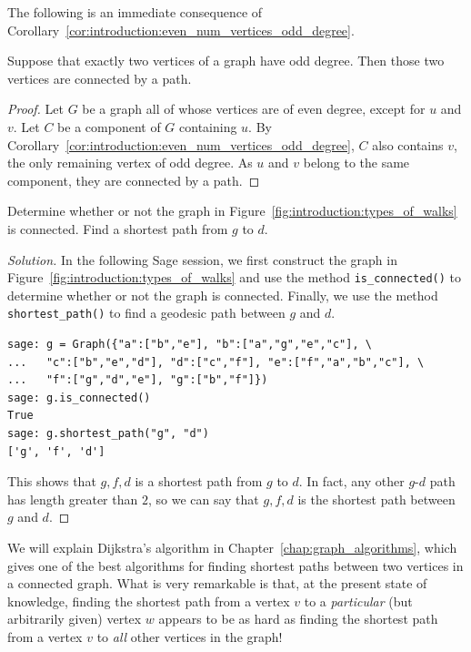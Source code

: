 The following is an immediate consequence of
Corollary~\ref{cor:introduction:even_num_vertices_odd_degree}.

\begin{proposition}
Suppose that exactly two vertices of a graph have odd degree. Then
those two vertices are connected by a path.
\end{proposition}

\begin{proof}
Let $G$ be a graph all of whose vertices are of even degree, except
for $u$ and $v$. Let $C$ be a component of $G$ containing $u$. By
Corollary~\ref{cor:introduction:even_num_vertices_odd_degree}, $C$
also contains $v$, the only remaining vertex of odd degree. As $u$ and
$v$ belong to the same component, they are connected by a path.
\end{proof}

\begin{example}
Determine whether or not the graph in
Figure~\ref{fig:introduction:types_of_walks} is connected. Find a
shortest path from $g$ to $d$.
\end{example}

\begin{proof}[Solution]
In the following Sage session, we first construct the graph in
Figure~\ref{fig:introduction:types_of_walks} and use the method
\verb!is_connected()! to determine whether or not the graph is
connected. Finally, we use the method \verb!shortest_path()! to find
a geodesic path between $g$ and $d$.
\begin{lstlisting}
sage: g = Graph({"a":["b","e"], "b":["a","g","e","c"], \
...   "c":["b","e","d"], "d":["c","f"], "e":["f","a","b","c"], \
...   "f":["g","d","e"], "g":["b","f"]})
sage: g.is_connected()
True
sage: g.shortest_path("g", "d")
['g', 'f', 'd']
\end{lstlisting}
This shows that $g, f, d$ is a shortest path from $g$ to $d$. In fact,
any other $g$-$d$ path has length greater than $2$, so we can say that
$g, f, d$ is the shortest path between $g$ and $d$.
\end{proof}

\begin{remark}
\rm
We will explain Dijkstra's algorithm in
Chapter~\ref{chap:graph_algorithms}, which gives one of the best
algorithms for finding shortest paths between two vertices in a
connected graph. What is very remarkable is that, at the present state
of knowledge, finding the shortest path from a vertex $v$ to a
\emph{particular} (but arbitrarily given) vertex $w$ appears to be as
hard as finding the shortest path from a vertex $v$ to \emph{all}
other vertices in the graph!
\end{remark}

